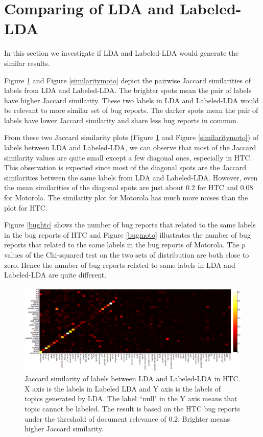 \documentclass[10pt, conference, compsocconf]{IEEEtran}
\begin{document}
\section{Comparing of LDA and Labeled-LDA}
In this section we investigate if LDA and Labeled-LDA would generate the similar results.

Figure \ref{similarityhtc} and Figure \ref{similaritymoto} depict the pairwise Jaccard similarities of labels from LDA and Labeled-LDA. The brighter spots mean the pair of labels have higher Jaccard similarity. These two labels in LDA and Labeled-LDA would be relevant to more similar set of bug reports. The darker spots mean the pair of labels have lower Jaccard similarity and share less bug reports in common. 

From these two Jaccard similarity plots (Figure \ref{similarityhtc} and Figure \ref{similaritymoto}) of labels between LDA and Labeled-LDA, we can observe that most of the Jaccard similarity values are quite small except a few diagonal ones, especially in HTC. This observation is expected since most of the diagonal spots are the Jaccard similarities between the same labels from LDA and Labeled-LDA. However, even the mean similarities of the diagonal spots are just about 0.2 for HTC and 0.08 for Motorola. The similarity plot for Motorola has much more noises than the plot for HTC.  

Figure \ref{bughtc} shows the number of bug reports that related to the same labels in the bug reports of HTC and Figure \ref{bugmoto} illustrates the number of bug reports that related to the same labels in the bug reports of Motorola. The $ p $ values of the Chi-squared test on the two sets of distribution are both close to zero. Hence the number of bug reports related to same labels in LDA and Labeled-LDA are quite different.

\begin{figure}[htb]
\centering
\includegraphics[width=1\textwidth]{htcsim.png}
\caption{Jaccard similarity of labels between LDA and Labeled-LDA in HTC. X axis is the labels in Labeled LDA and Y axis is the labels of topics generated by LDA. The label ``null" in the Y axis means that topic cannot be labeled. The result is based on the HTC bug reports under the threshold of document relevance of 0.2. Brighter means higher Jaccard similarity.}
\label{similarityhtc}
\end{figure}
\end{document}
